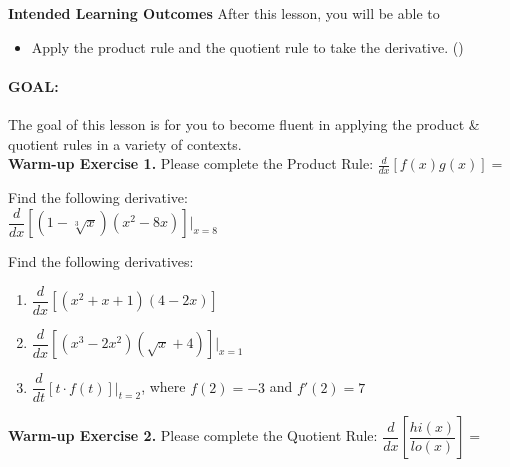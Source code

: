 \documentclass[10pt]{article}
\begin{document}
\pagestyle{otherpages}
\thispagestyle{firstpage}

\textbf{Intended Learning Outcomes}
After this lesson, you will be able to 

\begin{itemize}
    \item Apply the product rule and the quotient rule to take the derivative. ()
\end{itemize}

\vspace{-0.5cm}

\hrulefill

\paragraph*{GOAL:} The goal of this lesson is for you to become fluent in applying the product \& quotient rules in a variety of contexts.\\

{\bf\color{blue}Warm-up Exercise 1.} Please complete the Product Rule: $\displaystyle \frac{d}{dx}[f(x)g(x)]=$   

{} Find the following derivative:\\

$\dfrac{d}{dx}\left[(1-\sqrt[3]{x})(x^2-8x)\right]\bigg|_{x=8}$

\vfill

{} Find the following derivatives:\\

\begin{enumerate}
\item[(a)] $\dfrac{d}{dx}[(x^2+x+1)(4-2x)]$

\vfill

\item[(b)] $\dfrac{d}{dx}[(x^3-2x^2)(\sqrt{x}+4)]\bigg|_{x=1}$

\vfill
\vfill

\item[(c)] $\dfrac{d}{dt}\left[ t\cdot f(t) \right]\bigg|_{t=2}$, where $f(2)=-3$ and $f'(2)=7$

\vfill
\vfill

\end{enumerate}

\newpage

{\bf\color{blue}Warm-up Exercise 2.} Please complete the Quotient Rule: $\dfrac{d}{dx}\left[ \dfrac{hi(x)}{lo(x)} \right] =$  \\
\end{document}
